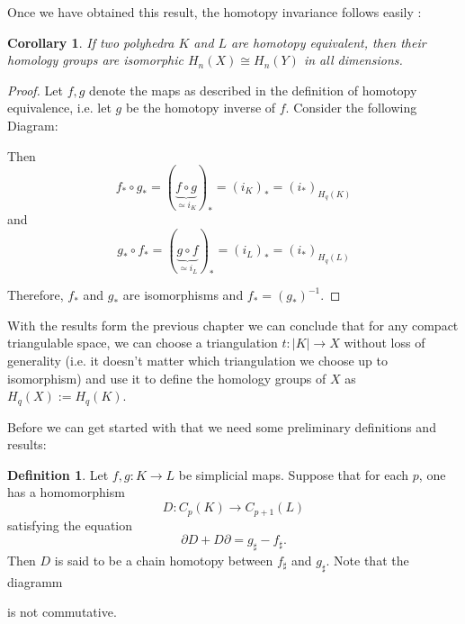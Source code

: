 \documentclass[toc=bib]{scrartcl}
\theoremstyle{plain}
\newtheorem{corollary}[theorem]{Corollary}
\theoremstyle{definition}
\newtheorem	{definition}[theorem]{Definition}
\theoremstyle{remark}
\newcommand{\isom}{\cong}
\begin{document}
Once we have obtained this result, the homotopy invariance follows easily \parencite[see][Theorem 8.11]{ar}:
\begin{corollary}
	If two polyhedra $K$ and $L$ are homotopy equivalent, then their homology groups are isomorphic $H_n(X)\isom H_n(Y)$ in all dimensions.
\end{corollary}
\begin{proof}
	Let $f,g$ denote the maps as described in the definition of homotopy equivalence, i.e. let $g$ be the homotopy inverse of $f$. 
	Consider the following Diagram:
	\begin{center}
	
	\end{center}

	Then 
	\[f_\ast\circ g_\ast=(\underset{\ensuremath{\simeq i_K}}{\underbrace{f\circ g}})_\ast=(i_K)_\ast=(i_\ast)_{H_q(K)}\]
	and
	\[g_\ast\circ f_\ast=(\underset{\ensuremath{\simeq i_L}}{\underbrace{g\circ f}})_\ast=(i_L)_\ast=(i_\ast)_{H_q(L)}\]
	
	Therefore, $f_\ast$ and $g_\ast$ are isomorphisms and $f_\ast=(g_\ast)^{-1}$.
\end{proof}

With the results form the previous chapter we can conclude that for any compact triangulable space, we can choose a triangulation $t:|K|\to X$ without loss of generality (i.e. it doesn't matter which triangulation we choose up to isomorphism) and use it to define the homology groups  of $X$ as $H_q(X):=H_q(K)$.



Before we can get started with that we need some preliminary definitions and results:


\begin{definition}
	Let $f,g:K\to L$ be simplicial maps. Suppose that for each $p$, one has a homomorphism \[
	D: C_p(K)\to C_{p+1}(L)
	\] satisfying the equation
	\[
	\partial D+D\partial=g_\sharp-f_\sharp.
	\]
	Then $D$ is said to be a chain homotopy between $f_\sharp$ and $g_\sharp$. Note that the diagramm
	\begin{center}
		
	\end{center}
	is not commutative.
\end{definition}
\end{document}
